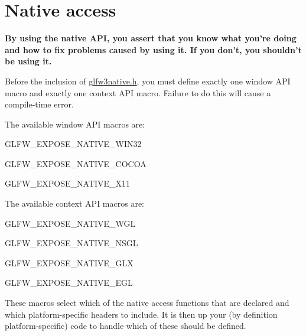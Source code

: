 \hypertarget{group__native}{\section{Native access}
\label{group__native}
}
{\bfseries By using the native A\-P\-I, you assert that you know what you're doing and how to fix problems caused by using it. If you don't, you shouldn't be using it.}

Before the inclusion of \hyperlink{glfw3native_8h}{glfw3native.\-h}, you must define exactly one window A\-P\-I macro and exactly one context A\-P\-I macro. Failure to do this will cause a compile-\/time error.

The available window A\-P\-I macros are\-:
\begin{DoxyItemize}
\item {\ttfamily G\-L\-F\-W\-\_\-\-E\-X\-P\-O\-S\-E\-\_\-\-N\-A\-T\-I\-V\-E\-\_\-\-W\-I\-N32}
\item {\ttfamily G\-L\-F\-W\-\_\-\-E\-X\-P\-O\-S\-E\-\_\-\-N\-A\-T\-I\-V\-E\-\_\-\-C\-O\-C\-O\-A}
\item {\ttfamily G\-L\-F\-W\-\_\-\-E\-X\-P\-O\-S\-E\-\_\-\-N\-A\-T\-I\-V\-E\-\_\-\-X11}
\end{DoxyItemize}

The available context A\-P\-I macros are\-:
\begin{DoxyItemize}
\item {\ttfamily G\-L\-F\-W\-\_\-\-E\-X\-P\-O\-S\-E\-\_\-\-N\-A\-T\-I\-V\-E\-\_\-\-W\-G\-L}
\item {\ttfamily G\-L\-F\-W\-\_\-\-E\-X\-P\-O\-S\-E\-\_\-\-N\-A\-T\-I\-V\-E\-\_\-\-N\-S\-G\-L}
\item {\ttfamily G\-L\-F\-W\-\_\-\-E\-X\-P\-O\-S\-E\-\_\-\-N\-A\-T\-I\-V\-E\-\_\-\-G\-L\-X}
\item {\ttfamily G\-L\-F\-W\-\_\-\-E\-X\-P\-O\-S\-E\-\_\-\-N\-A\-T\-I\-V\-E\-\_\-\-E\-G\-L}
\end{DoxyItemize}

These macros select which of the native access functions that are declared and which platform-\/specific headers to include. It is then up your (by definition platform-\/specific) code to handle which of these should be defined. 
